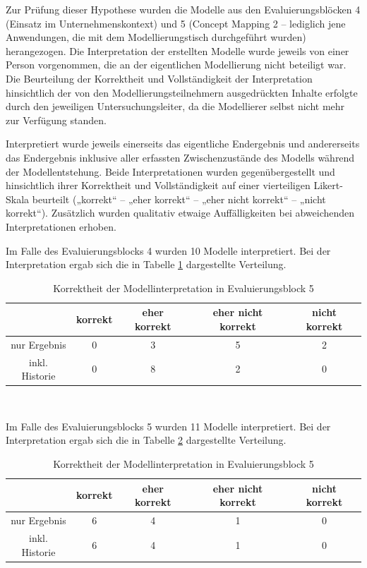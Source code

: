 Zur Prüfung dieser Hypothese wurden die Modelle aus den Evaluierungsblöcken 4 (Einsatz im Unternehmenskontext) und 5 (Concept Mapping 2 -- lediglich jene Anwendungen, die mit dem Modellierungstisch durchgeführt wurden) herangezogen. Die Interpretation der erstellten Modelle wurde jeweils von einer Person vorgenommen, die an der eigentlichen Modellierung nicht beteiligt war. Die Beurteilung der Korrektheit und Vollständigkeit der Interpretation hinsichtlich der von den Modellierungsteilnehmern ausgedrückten Inhalte erfolgte durch den jeweiligen Untersuchungsleiter, da die Modellierer selbst nicht mehr zur Verfügung standen.

Interpretiert wurde jeweils einerseits das eigentliche Endergebnis und andererseits das Endergebnis inklusive aller erfassten Zwischenzustände des Modells während der Modellentstehung. Beide Interpretationen wurden gegenübergestellt und hinsichtlich ihrer Korrektheit und Vollständigkeit auf einer vierteiligen Likert-Skala beurteilt („korrekt“ -- „eher korrekt“ -- „eher nicht korrekt“ -- „nicht korrekt“). Zusätzlich wurden qualitativ etwaige Auffälligkeiten bei abweichenden Interpretationen erhoben.

Im Falle des Evaluierungsblocks 4 wurden 10 Modelle interpretiert. Bei der Interpretation ergab sich die in Tabelle \ref{tab:interpretation_block4} dargestellte Verteilung.

\begin{table}[htbp]
	\centering
	\caption{Korrektheit der Modellinterpretation in Evaluierungsblock 5}
\begin{tabular}{| c || c | c | c | c |}
  \hline
   & korrekt & eher korrekt & eher nicht korrekt & nicht korrekt \\ \hline
   nur Ergebnis   & 0 & 3 & 5 & 2 \\ 
   inkl. Historie & 0 & 8 & 2 & 0 \\ \hline
\end{tabular} \\
	\label{tab:interpretation_block4}
\end{table}

Im Falle des Evaluierungsblocks 5 wurden 11 Modelle interpretiert. Bei der Interpretation ergab sich die in Tabelle \ref{tab:interpretation_block5} dargestellte Verteilung.

\begin{table}[htbp]
	\centering
	\caption{Korrektheit der Modellinterpretation in Evaluierungsblock 5}
\begin{tabular}{| c || c | c | c | c |}
  \hline
   & korrekt & eher korrekt & eher nicht korrekt & nicht korrekt \\ \hline
   nur Ergebnis   & 6 & 4 & 1 & 0 \\ 
   inkl. Historie & 6 & 4 & 1 & 0 \\ \hline
\end{tabular} \\
	\label{tab:interpretation_block5}
\end{table}

